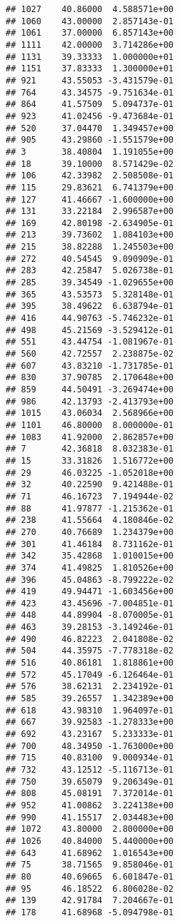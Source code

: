 \documentclass[
]{article}
\begin{document}
\begin{verbatim}
## 1027    40.86000  4.588571e+00
## 1060    43.00000  2.857143e-01
## 1061    37.00000  6.857143e+00
## 1111    42.00000  3.714286e+00
## 1131    39.33333  1.000000e+01
## 1151    37.83333  1.300000e+01
## 921     43.55053 -3.431579e-01
## 764     43.34575 -9.751634e-01
## 864     41.57509  5.094737e-01
## 923     41.02456 -9.473684e-01
## 520     37.04470  1.349457e+00
## 905     43.29860 -1.551579e+00
## 3       38.40804  1.191055e+00
## 18      39.10000  8.571429e-02
## 106     42.33982  2.508508e-01
## 115     29.83621  6.741379e+00
## 127     41.46667 -1.600000e+00
## 131     33.22184  2.996587e+00
## 169     42.80198 -2.634905e-01
## 213     39.73602  1.084103e+00
## 215     38.82288  1.245503e+00
## 272     40.54545  9.090909e-01
## 283     42.25847  5.026738e-01
## 285     39.34549 -1.029655e+00
## 365     43.53573  5.328148e-01
## 395     38.49622  6.638794e-01
## 416     44.90763 -5.746232e-01
## 498     45.21569 -3.529412e-01
## 551     43.44754 -1.081967e-01
## 560     42.72557  2.238875e-02
## 607     43.83210 -1.731785e-01
## 830     37.90785  2.170648e+00
## 859     44.50491 -3.269474e+00
## 986     42.13793 -2.413793e+00
## 1015    43.06034  2.568966e+00
## 1101    46.80000  8.000000e-01
## 1083    41.92000  2.862857e+00
## 7       42.36818  8.032383e-01
## 15      33.31826  1.516772e+00
## 29      46.03225 -1.052018e+00
## 32      40.22590  9.421488e-01
## 71      46.16723  7.194944e-02
## 88      41.97877 -1.215362e-01
## 238     41.55664  4.180846e-02
## 270     40.76689  1.234379e+00
## 301     41.46184  8.731162e-01
## 342     35.42868  1.010015e+00
## 374     41.49825  1.810526e+00
## 396     45.04863 -8.799222e-02
## 419     49.94471 -1.603456e+00
## 423     43.45696 -7.004851e-01
## 448     44.89904 -8.070005e-01
## 463     39.28153 -3.149246e-01
## 490     46.82223  2.041808e-02
## 504     44.35975 -7.778318e-02
## 516     40.86181  1.818861e+00
## 572     45.17049 -6.126464e-01
## 576     38.62131  2.234192e-01
## 585     39.26557  1.342389e+00
## 618     43.98310  1.964097e-01
## 667     39.92583 -1.278333e+00
## 692     43.23167  5.233333e-01
## 700     48.34950 -1.763000e+00
## 715     40.83100  9.000934e-01
## 732     43.12512 -5.116713e-01
## 750     39.65079  9.206349e-01
## 808     45.08191  7.372014e-01
## 952     41.00862  3.224138e+00
## 990     41.15517  2.034483e+00
## 1072    43.80000  2.800000e+00
## 1026    40.84000  5.440000e+00
## 643     41.68962  1.016543e+00
## 75      38.71565  9.858046e-01
## 80      40.69665  6.601847e-01
## 95      46.18522  6.806028e-02
## 139     42.91784  7.204667e-01
## 178     41.68968 -5.094798e-01

\end{verbatim}
\end{document}

